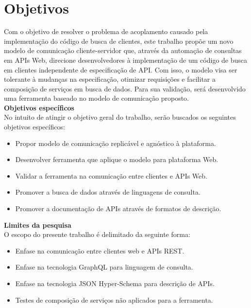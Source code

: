 \section[Objetivos]{Objetivos}

Com o objetivo de resolver o problema de acoplamento causado pela implementação do código de busca de clientes, este trabalho propõe um novo modelo de comunicação cliente-servidor que, através da automação de consultas em APIs Web, direcione desenvolvedores à implementação de um código de busca em clientes independente de especificação de API. Com isso, o modelo visa ser tolerante à mudanças na especificação, otimizar requisições e facilitar a composição de serviços em busca de dados. Para sua validação, será desenvolvido uma ferramenta baseado no modelo de comunicação proposto. \\

\textbf{Objetivos específicos} \\

No intuito de atingir o objetivo geral do trabalho, serão buscados os seguintes objetivos específicos:

\begin{itemize}
\item Propor modelo de comunicação replicável e agnóstico à plataforma.
\item Desenvolver ferramenta que aplique o modelo para plataforma Web.
\item Validar a ferramenta na comunicação entre clientes e APIs Web.
\item Promover a busca de dados através de linguagens de consulta.
\item Promover a documentação de APIs através de formatos de descrição. \\
\end{itemize}

\textbf{Limites da pesquisa} \\

O escopo do presente trabalho é delimitado da seguinte forma:

\begin{itemize}
\item Enfase na comunicação entre clientes web e APIs REST.
\item Enfase na tecnologia GraphQL para linguagem de consulta.
\item Enfase na tecnologia JSON Hyper-Schema para descrição de APIs.
\item Testes de composição de serviços não aplicados para a ferramenta.
\end{itemize}
